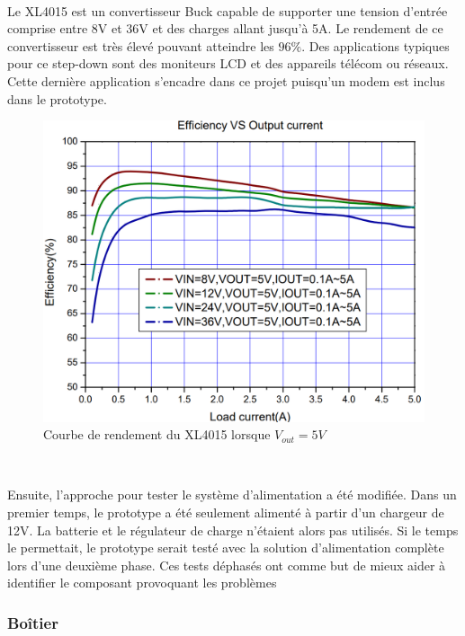 ~

\noindent
Le XL4015 est un convertisseur Buck capable de supporter une tension d'entrée comprise entre 8V et 36V et des charges allant jusqu'à 5A. Le rendement de ce convertisseur est très élevé pouvant atteindre les $96\%$. Des applications typiques pour ce step-down sont des moniteurs LCD et des appareils télécom ou réseaux. Cette dernière application s'encadre dans ce projet puisqu'un modem est inclus dans le prototype.


\begin{figure}[ht!]
  \centering
  \includegraphics[scale=0.4]{img/el_prototype/rendement.png}
  \caption{Courbe de rendement du XL4015 lorsque $V_{out} = 5V$ \cite{xl4015_datasheet}}
  \label{fig:xlrend}
\end{figure}
~

\noindent
Ensuite, l'approche pour tester le système d'alimentation a été modifiée. Dans un premier temps, le prototype a été seulement alimenté à partir d'un chargeur de 12V. La batterie et le régulateur de charge n'étaient alors pas utilisés. Si le temps le permettait, le prototype serait testé avec la solution d'alimentation complète lors d'une deuxième phase. Ces tests déphasés ont comme but de mieux aider à identifier le composant provoquant les problèmes


\subsubsection{Boîtier}

